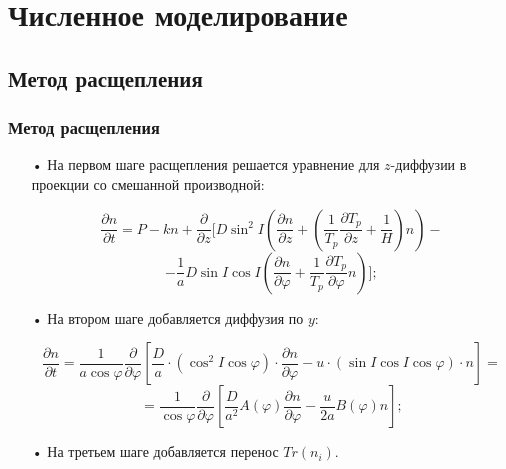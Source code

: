 \documentclass[9pt, apectratio=43,unicode]{beamer}
\begin{document}
\section{Численное моделирование}

\subsection{Метод расщепления}

\begin{frame}\frametitle{Метод расщепления}
\begin{itemize}
\item[•] На первом шаге расщепления решается уравнение для $z$-диффузии в проекции со смешанной производной:

$$\dfrac{\partial n}{\partial t} =P-kn+\dfrac{\partial}{\partial z}\biggl[D\sin^2 I\left(\dfrac{\partial n}{\partial z}+\left(\dfrac{1}{T_p}\dfrac{\partial T_p}{\partial z}+\dfrac{1}{H}\right)n\right)-$$ $$-\dfrac{1}{a}D\sin I\cos I\left(\dfrac{\partial n}{\partial\varphi}+\dfrac{1}{T_p}\dfrac{\partial T_p}{\partial\varphi}n\right)\biggr];$$
 
\item[•] На втором шаге добавляется диффузия по $y$:
 
 $$\dfrac{\partial n}{\partial t} = \dfrac{1}{a\cos\varphi} \dfrac{\partial }{\partial \varphi}\left[\dfrac{D}{a}\cdot(\cos^2  I \cos\varphi)\cdot\dfrac{\partial n}{\partial \varphi} - u\cdot(\sin I \cos I \cos\varphi)\cdot n \right]=$$$$=  \dfrac{1}{\cos\varphi} \dfrac{\partial }{\partial \varphi}\left[\dfrac{D}{a^2}A(\varphi)\dfrac{\partial n}{\partial \varphi} - \dfrac{u}{2a}B(\varphi) n \right];$$

\item[•] На третьем шаге добавляется перенос $Tr(n_i)$.
\end{itemize}

\end{frame}
\end{document}
